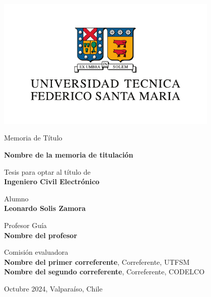\begin{titlepage}
    \begin{center}
        \vspace*{0pt}
        \includegraphics[width=0.8\textwidth]{images/logoUSM.pdf}
        
        \Large
        Memoria de Título\\
        \huge
        \vspace{0.5cm}
        
        \textbf{Nombre de la memoria de titulación}\\
        \vspace{1.5cm}
        
        \normalsize
        Tesis para optar al título de\\
        \textbf{Ingeniero Civil Electrónico}
        
        \vfill
            
        Alumno\\
        \textbf{Leonardo Solis Zamora}
        \vspace{0.8cm}
            
        Profesor Guía\\
        \textbf{Nombre del profesor}
        \vspace{0.8cm}
        
        Comisión evaluadora\\
        \textbf{Nombre del primer correferente}, Correferente, UTFSM\\
        \textbf{Nombre del segundo correferente}, Correferente, CODELCO
        \vspace{1cm}
        
        Octubre 2024, Valparaíso, Chile
    \end{center}
\end{titlepage}